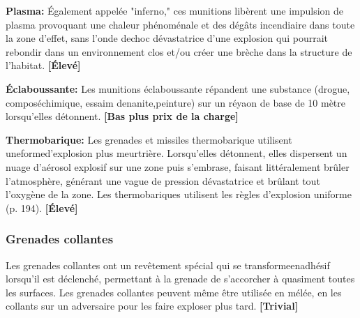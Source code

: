 \textbf{Plasma:} Également appelée "inferno," ces munitions libèrent une impulsion de plasma provoquant une chaleur phénoménale et des dégâts incendiaire dans toute la zone d'effet, sans l'onde dechoc dévastatrice d'une explosion qui pourrait rebondir dans un environnement clos et/ou créer une brèche dans la structure de l'habitat. \textbf{[Élevé]} 

\textbf{Éclaboussante:} Les munitions éclaboussante répandent une substance (drogue, composéchimique, essaim denanite,peinture) sur un réyaon de base de 10 mètre lorsqu'elles détonnent. \textbf{[Bas plus prix de la charge]} 

\textbf{Thermobarique:} Les grenades et missiles thermobarique utilisent uneformed'explosion plus meurtrière. Lorsqu'elles détonnent, elles dispersent un nuage d'aérosol explosif sur une zone puis s'embrase, faisant littéralement brûler l'atmosphère, générant une vague de pression dévastatrice et brûlant tout l'oxygène de la zone. Les thermobariques utilisent les règles d'explosion uniforme (p. 194). \textbf{[Élevé]} 

\subsubsection{Grenades collantes} 

Les grenades collantes ont un revêtement spécial qui se transformeenadhésif lorsqu'il est déclenché, permettant à la grenade de s'accorcher à quasiment toutes les surfaces. Les grenades collantes peuvent même être utilisée en mélée, en les collants sur un adversaire pour les faire exploser plus tard. \textbf{[Trivial]} 

